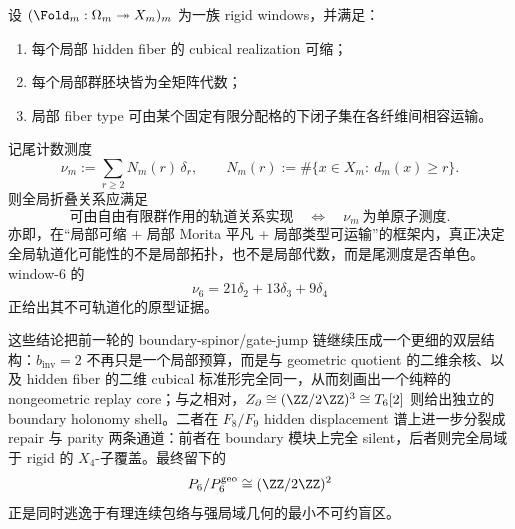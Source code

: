 \begin{conjecture}[单原子尾测度的全局轨道化判据]\label{conj:conclusion-window6-single-atom-tail-measure-global-orbitization-criterion}
设 \((\Fold_m:\Omega_m\twoheadrightarrow X_m)_m\) 为一族 rigid windows，并满足：
\begin{enumerate}
  \item 每个局部 hidden fiber 的 cubical realization 可缩；
  \item 每个局部群胚块皆为全矩阵代数；
  \item 局部 fiber type 可由某个固定有限分配格的下闭子集在各纤维间相容运输。
\end{enumerate}
记尾计数测度
\[
\nu_m:=\sum_{r\ge 2}N_m(r)\,\delta_r,
\qquad
N_m(r):=\#\{x\in X_m:\ d_m(x)\ge r\}.
\]
则全局折叠关系应满足
\[
\text{可由自由有限群作用的轨道关系实现}
\quad\Longleftrightarrow\quad
\nu_m\ \text{为单原子测度}.
\]
亦即，在“局部可缩 + 局部 Morita 平凡 + 局部类型可运输”的框架内，真正决定全局轨道化可能性的不是局部拓扑，也不是局部代数，而是尾测度是否单色。window-\(6\) 的
\[
\nu_6=21\delta_2+13\delta_3+9\delta_4
\]
正给出其不可轨道化的原型证据。
\end{conjecture}

\noindent
这些结论把前一轮的 boundary-spinor/gate-jump 链继续压成一个更细的双层结构：\(b_{\mathrm{inv}}=2\) 不再只是一个局部预算，而是与 geometric quotient 的二维余核、以及 hidden fiber 的二维 cubical 标准形完全同一，从而刻画出一个纯粹的 nongeometric replay core；与之相对，\(Z_{\partial}\cong (\ZZ/2\ZZ)^3\cong T_6[2]\) 则给出独立的 boundary holonomy shell。二者在 \(F_8/F_9\) hidden displacement 谱上进一步分裂成 repair 与 parity 两条通道：前者在 boundary 模块上完全 silent，后者则完全局域于 rigid 的 \(X_4\)-子覆盖。最终留下的
\[
P_6/P_6^{\mathrm{geo}}\cong (\ZZ/2\ZZ)^2
\]
正是同时逃逸于有理连续包络与强局域几何的最小不可约盲区。
